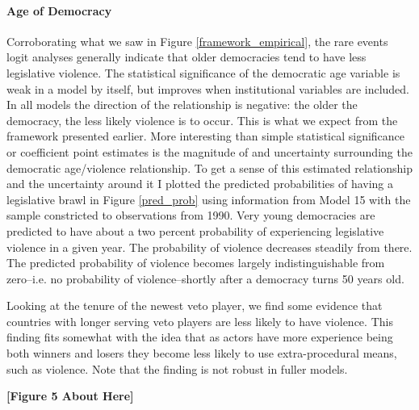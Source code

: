 \documentclass[a4paper]{article}\usepackage{graphicx, color}
\begin{document}
\paragraph{Age of Democracy}
Corroborating what we saw in Figure \ref{framework_empirical}, the rare events logit analyses generally indicate that older democracies tend to have less legislative violence. The statistical significance of the democratic age variable is weak in a model by itself, but improves when institutional variables are included. In all models the direction of the relationship is negative: the older the democracy, the less likely violence is to occur. This is what we expect from the framework presented earlier. More interesting than simple statistical significance or coefficient point estimates is the magnitude of and uncertainty surrounding the democratic age/violence relationship. To get a sense of this estimated relationship and the uncertainty around it \citep[see][]{King2000} I plotted the predicted probabilities of having a legislative brawl in Figure \ref{pred_prob} using information from Model 15 with the sample constricted to observations from 1990. Very young democracies are predicted to have about a two percent probability of experiencing legislative violence in a given year. The probability of violence decreases steadily from there. The predicted probability of violence becomes largely indistinguishable from zero--i.e. no probability of violence--shortly after a democracy turns 50 years old.

Looking at the tenure of the newest veto player, we find some evidence that countries with longer serving veto players are less likely to have violence. This finding fits somewhat with the idea that as actors have more experience being both winners and losers they become less likely to use extra-procedural means, such as violence. Note that the finding is not robust in fuller models.

\begin{center}

    {\bf{[Figure 5 About Here]}}

\end{center}
\end{document}

